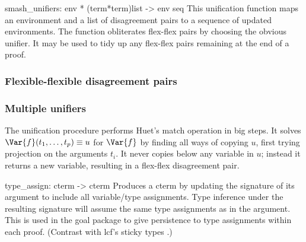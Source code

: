\beginprog
smash_unifiers: env * (term*term)list -> env seq
\endprog
This unification function maps an environment and a list of disagreement
pairs to a sequence of updated environments. The function obliterates
flex-flex pairs by choosing the obvious unifier. It may be used to tidy up
any flex-flex pairs remaining at the end of a proof.

\subsubsection{Flexible-flexible disagreement pairs}


\subsubsection{Multiple unifiers}
The unification procedure performs Huet's {\sc match} operation
\cite{huet75} in big steps.
It solves \(\Var{f}(t_1,\ldots,t_p) \equiv u\) for \(\Var{f}\) by finding
all ways of copying \(u\), first trying projection on the arguments
\(t_i\).  It never copies below any variable in \(u\); instead it returns a
new variable, resulting in a flex-flex disagreement pair.  


\beginprog
type_assign: cterm -> cterm
\endprog
Produces a cterm by updating the signature of its argument
to include all variable/type assignments.
Type inference under the resulting signature will assume the
same type assignments as in the argument.
This is used in the goal package to give persistence to type assignments
within each proof. 
(Contrast with {\sc lcf}'s sticky types \cite[page 148]{paulson-book}.)


